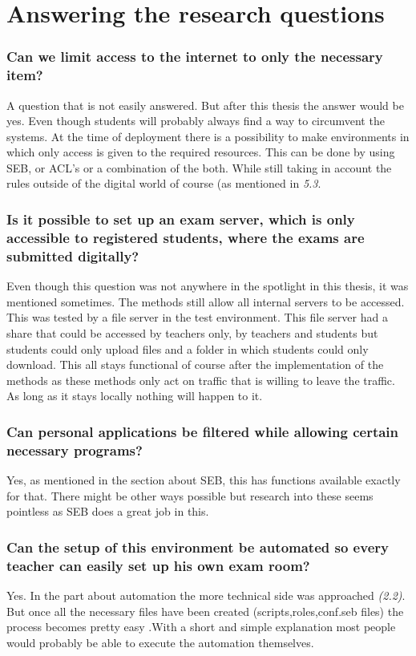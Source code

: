 \section{Answering the research questions}
\subsubsection{Can we limit access to the internet to only the necessary item?}
A question that is not easily answered. But after this thesis the answer would be yes. Even though students will probably always find a way to circumvent the systems. At the time of deployment there is a possibility to make environments in which only access is given to the required resources. This can be done by using SEB, or ACL's or a combination of the both. While still taking in account the rules outside of the digital world of course (as mentioned in \textit{5.3}.
\subsubsection{Is it possible to set up an exam server, which is only accessible to registered students, where the exams are submitted digitally?}
Even though this question was not anywhere in the spotlight in this thesis, it was mentioned sometimes. The methods still allow all internal servers to be accessed. This was tested by a file server in the test environment. This file server had a share that could be accessed by teachers only, by teachers and students but students could only upload files and a folder in which students could only download. This all stays functional of course after the implementation of the methods as these methods only act on traffic that is willing to leave the traffic. As long as it stays locally nothing will happen to it.
\subsubsection{Can personal applications be filtered while allowing certain necessary programs?}
Yes, as mentioned in the section about SEB, this has functions available exactly for that. There might be other ways possible but research into these seems pointless as SEB does a great job in this.
\subsubsection{Can the setup of this environment be automated so every teacher can easily set up his own exam room?}
Yes. In the part about automation the more technical side was approached \textit{(2.2)}. But once all the necessary files have been created (scripts,roles,conf.seb files) the process becomes pretty easy .With a short and simple explanation most people would probably be able to execute the automation themselves.
